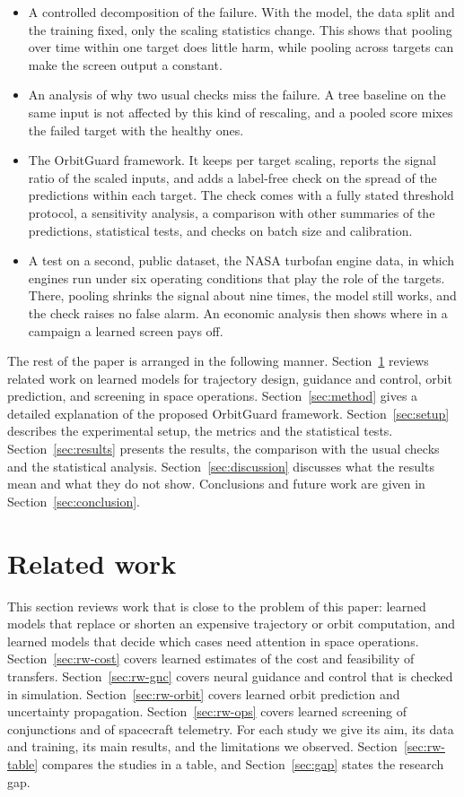 \begin{itemize}
\item A controlled decomposition of the failure. With the model, the data split and the training fixed, only the scaling statistics change. This shows that pooling over time within one target does little harm, while pooling across targets can make the screen output a constant.
\item An analysis of why two usual checks miss the failure. A tree baseline on the same input is not affected by this kind of rescaling, and a pooled score mixes the failed target with the healthy ones.
\item The OrbitGuard framework. It keeps per target scaling, reports the signal ratio of the scaled inputs, and adds a label-free check on the spread of the predictions within each target. The check comes with a fully stated threshold protocol, a sensitivity analysis, a comparison with other summaries of the predictions, statistical tests, and checks on batch size and calibration.
\item A test on a second, public dataset, the NASA turbofan engine data, in which engines run under six operating conditions that play the role of the targets. There, pooling shrinks the signal about nine times, the model still works, and the check raises no false alarm. An economic analysis then shows where in a campaign a learned screen pays off.
\end{itemize}

The rest of the paper is arranged in the following manner. Section~\ref{sec:review} reviews related work on learned models for trajectory design, guidance and control, orbit prediction, and screening in space operations. Section~\ref{sec:method} gives a detailed explanation of the proposed OrbitGuard framework. Section~\ref{sec:setup} describes the experimental setup, the metrics and the statistical tests. Section~\ref{sec:results} presents the results, the comparison with the usual checks and the statistical analysis. Section~\ref{sec:discussion} discusses what the results mean and what they do not show. Conclusions and future work are given in Section~\ref{sec:conclusion}.

\section{Related work}
\label{sec:review}

This section reviews work that is close to the problem of this paper: learned models that replace or shorten an expensive trajectory or orbit computation, and learned models that decide which cases need attention in space operations. Section~\ref{sec:rw-cost} covers learned estimates of the cost and feasibility of transfers. Section~\ref{sec:rw-gnc} covers neural guidance and control that is checked in simulation. Section~\ref{sec:rw-orbit} covers learned orbit prediction and uncertainty propagation. Section~\ref{sec:rw-ops} covers learned screening of conjunctions and of spacecraft telemetry. For each study we give its aim, its data and training, its main results, and the limitations we observed. Section~\ref{sec:rw-table} compares the studies in a table, and Section~\ref{sec:gap} states the research gap.

